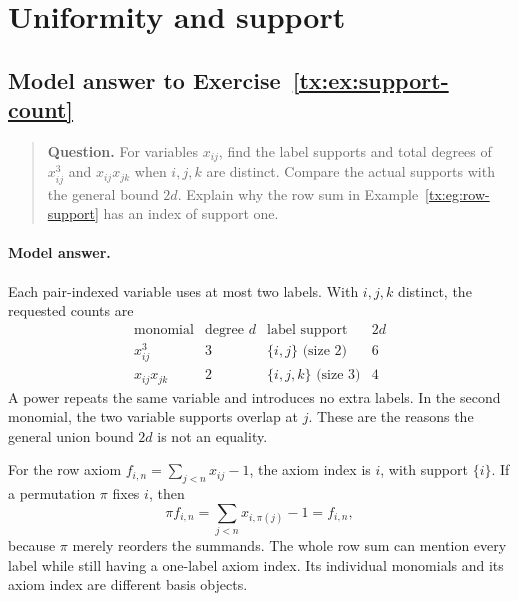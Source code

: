 \documentclass[11pt,a4paper,oneside,openany]{book}
\theoremstyle{definition}\newtheorem{definition}[theorem]{Definition}
\theoremstyle{remark}\newtheorem{remark}[theorem]{Remark}
\numberwithin{equation}{chapter}
\begin{document}
\par


\section{Uniformity and support}

\begin{samepage}

\subsection*{Model answer to Exercise~\ref{tx:ex:support-count}}\label{tx:ans:support-count}

\begin{quote}\small\textbf{Question.} For variables $x_{ij}$, find the label supports and total degrees of
$x_{ij}^3$ and $x_{ij}x_{jk}$ when $i,j,k$ are distinct. Compare the
actual supports with the general bound $2d$. Explain why the row sum
in Example~\ref{tx:eg:row-support} has an index of support one.
\end{quote}

\paragraph{Model answer.}
Each pair-indexed variable uses at most two labels.
With \(i,j,k\) distinct, the requested counts are
\[
 \begin{array}{c|c|c|c}
 \text{monomial}&\text{degree }d&\text{label support}&2d\\ \hline
 x_{ij}^3&3&\{i,j\}\text{ (size }2)&6\\
 x_{ij}x_{jk}&2&\{i,j,k\}\text{ (size }3)&4
 \end{array}
\]
A power repeats the same variable and introduces no extra labels.
In the second monomial, the two variable supports overlap at \(j\).
These are the reasons the general union bound \(2d\) is not an equality.
\end{samepage}

For the row axiom \(f_{i,n}=\sum_{j<n}x_{ij}-1\), the axiom
index is \(i\), with support \(\{i\}\). If a permutation \(\pi\)
fixes \(i\), then
\[
 \pi f_{i,n}=\sum_{j<n}x_{i,\pi(j)}-1=f_{i,n},
\]
because \(\pi\) merely reorders the summands. The whole row sum can
mention every label while still having a one-label axiom index.
Its individual monomials and its axiom index are different basis objects.
\end{document}
